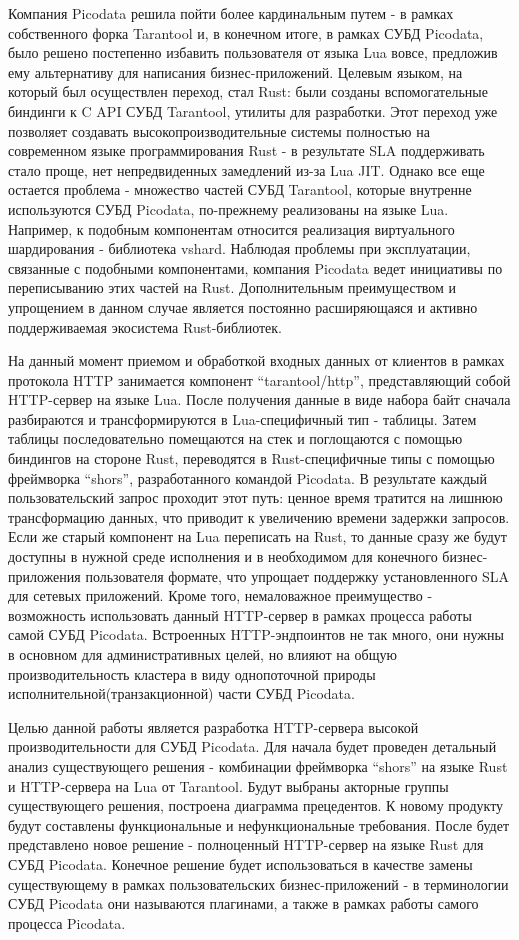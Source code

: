 \documentclass[times,numbers=noenddot]{itmo-student-thesis}
\begin{document}
Компания Picodata решила пойти более кардинальным путем - в рамках собственного форка Tarantool и, в конечном итоге, в рамках СУБД Picodata, было решено постепенно избавить пользователя от языка Lua вовсе, предложив ему альтернативу для написания бизнес-приложений.
Целевым языком, на который был осуществлен переход, стал Rust: были созданы вспомогательные биндинги к C API СУБД Tarantool, утилиты для разработки.
Этот переход уже позволяет создавать высокопроизводительные системы полностью на современном языке программирования Rust - в результате SLA поддерживать стало проще, нет непредвиденных замедлений из-за Lua JIT.
Однако все еще остается проблема - множество частей СУБД Tarantool, которые внутренне используются СУБД Picodata, по-прежнему реализованы на языке Lua.
Например, к подобным компонентам относится реализация виртуального шардирования - библиотека vshard.
Наблюдая проблемы при эксплуатации, связанные с подобными компонентами, компания Picodata ведет инициативы по переписыванию этих частей на Rust.
Дополнительным преимуществом и упрощением в данном случае является постоянно расширяющаяся и активно поддерживаемая экосистема Rust-библиотек.

На данный момент приемом и обработкой входных данных от клиентов в рамках протокола HTTP занимается компонент “tarantool/http”, представляющий собой HTTP-сервер на языке Lua.
После получения данные в виде набора байт сначала разбираются и трансформируются в Lua-специфичный тип - таблицы.
Затем таблицы последовательно помещаются на стек и поглощаются с помощью биндингов на стороне Rust, переводятся в Rust-специфичные типы с помощью фреймворка “shors”, разработанного командой Picodata.
В результате каждый пользовательский запрос проходит этот путь: ценное время тратится на лишнюю трансформацию данных, что приводит к увеличению времени задержки запросов.
Если же старый компонент на Lua переписать на Rust, то данные сразу же будут доступны в нужной среде исполнения и в необходимом для конечного бизнес-приложения пользователя формате, что упрощает поддержку установленного SLA для сетевых приложений.
Кроме того, немаловажное преимущество - возможность использовать данный HTTP-сервер в рамках процесса работы самой СУБД Picodata.
Встроенных HTTP-эндпоинтов не так много, они нужны в основном для административных целей, но влияют на общую производительность кластера в виду однопоточной природы исполнительной(транзакционной) части СУБД Picodata.

Целью данной работы является разработка HTTP-сервера высокой производительности для СУБД Picodata.
Для начала будет проведен детальный анализ существующего решения - комбинации фреймворка “shors” на языке Rust и HTTP-сервера на Lua от Tarantool.
Будут выбраны акторные группы существующего решения, построена диаграмма прецедентов.
К новому продукту будут составлены функциональные и нефункциональные требования.
После будет представлено новое решение - полноценный HTTP-сервер на языке Rust для СУБД Picodata.
Конечное решение будет использоваться в качестве замены существующему в рамках пользовательских бизнес-приложений - в терминологии СУБД Picodata они называются плагинами, а также в рамках работы самого процесса Picodata.
\end{document}
